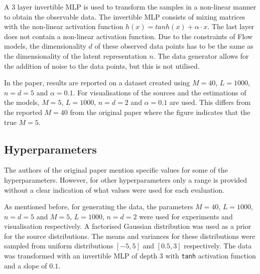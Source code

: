 A 3 layer invertible MLP is used to transform the samples in a non-linear manner to obtain the observable data. The invertible MLP consists of mixing matrices with the non-linear activation function $h(x)=tanh(x)+\alpha\cdot x$. The last layer does not contain a non-linear activation function. Due to the constraints of Flow models, the dimensionality $d$ of these observed data points has to be the same as the dimensionality of the latent representation $n$. The data generator allows for the addition of noise to the data points, but this is not utilised.

In the paper, results are reported on a dataset created using $M = 40$, $L = 1000$, $n = d = 5$ and $\alpha=0.1$. For visualisations of the sources and the estimations of the models, $M = 5$, $L = 1000$, $n = d = 2$ and $\alpha=0.1$ are used. This differs from the reported $M = 40$ from the original paper where the figure indicates that the true $M = 5$.

\subsection{Hyperparameters}
The authors of the original paper mention specific values for some of the hyperparameters. However, for other hyperparameters only a range is provided without a clear indication of what values were used for each evaluation. 

As mentioned before, for generating the data, the parameters $M = 40$, $L = 1000$, $n = d = 5$ and $M = 5$, $L = 1000$, $n = d = 2$ were used for experiments and visualisation respectively. A factorised Gaussian distribution was used as a prior for the source distributions. The means and variances for these distributions were sampled from uniform distributions $[-5,5]$ and $[0.5,3]$ respectively. The data was transformed with an invertible MLP of depth 3 with \texttt{tanh} activation function and a slope of $0.1$.

